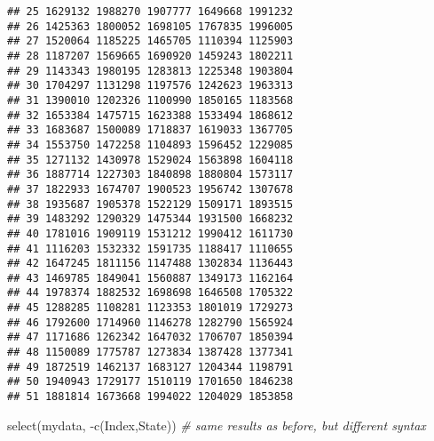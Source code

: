 \documentclass[
]{article}
\newenvironment{Shaded}{\begin{snugshade}}{\end{snugshade}}
\newcommand{\CommentTok}[1]{\textcolor[rgb]{0.56,0.35,0.01}{\textit{#1}}}
\newcommand{\FunctionTok}[1]{\textcolor[rgb]{0.00,0.00,0.00}{#1}}
\newcommand{\NormalTok}[1]{#1}
\newcommand{\SpecialCharTok}[1]{\textcolor[rgb]{0.00,0.00,0.00}{#1}}
\begin{document}
\begin{verbatim}
## 25 1629132 1988270 1907777 1649668 1991232
## 26 1425363 1800052 1698105 1767835 1996005
## 27 1520064 1185225 1465705 1110394 1125903
## 28 1187207 1569665 1690920 1459243 1802211
## 29 1143343 1980195 1283813 1225348 1903804
## 30 1704297 1131298 1197576 1242623 1963313
## 31 1390010 1202326 1100990 1850165 1183568
## 32 1653384 1475715 1623388 1533494 1868612
## 33 1683687 1500089 1718837 1619033 1367705
## 34 1553750 1472258 1104893 1596452 1229085
## 35 1271132 1430978 1529024 1563898 1604118
## 36 1887714 1227303 1840898 1880804 1573117
## 37 1822933 1674707 1900523 1956742 1307678
## 38 1935687 1905378 1522129 1509171 1893515
## 39 1483292 1290329 1475344 1931500 1668232
## 40 1781016 1909119 1531212 1990412 1611730
## 41 1116203 1532332 1591735 1188417 1110655
## 42 1647245 1811156 1147488 1302834 1136443
## 43 1469785 1849041 1560887 1349173 1162164
## 44 1978374 1882532 1698698 1646508 1705322
## 45 1288285 1108281 1123353 1801019 1729273
## 46 1792600 1714960 1146278 1282790 1565924
## 47 1171686 1262342 1647032 1706707 1850394
## 48 1150089 1775787 1273834 1387428 1377341
## 49 1872519 1462137 1683127 1204344 1198791
## 50 1940943 1729177 1510119 1701650 1846238
## 51 1881814 1673668 1994022 1204029 1853858
\end{verbatim}

\begin{Shaded}
\begin{Highlighting}[]
\FunctionTok{select}\NormalTok{(mydata, }\SpecialCharTok{{-}}\FunctionTok{c}\NormalTok{(Index,State)) }\CommentTok{\# same results as before, but different syntax}
\end{Highlighting}
\end{Shaded}
\end{document}
